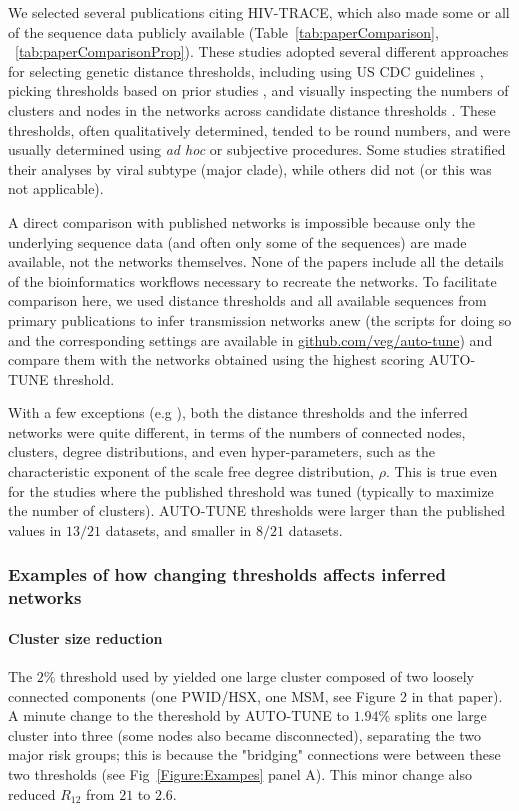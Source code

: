 \documentclass[utf8]{FrontiersinHarvard} %
\begin{document}
We selected several publications citing HIV-TRACE, which also made  some or all
of the sequence data publicly available (Table~\ref{tab:paperComparison},
~\ref{tab:paperComparisonProp}). These studies adopted several different
approaches for selecting genetic distance thresholds, including using US CDC
guidelines \citep{yan_central_2020}, picking thresholds based on prior studies
\citep{sivay_hiv-1_2018}, and visually inspecting the numbers of clusters and
nodes in the networks across candidate distance thresholds
\citep{liu_dynamics_2020}. These thresholds, often qualitatively determined,
tended to be round numbers, and were usually determined using {\it ad hoc} or
subjective procedures. Some studies stratified their analyses by viral subtype
(major clade), while others did not (or this was not applicable).

A direct comparison with published networks is impossible because only the
underlying sequence data (and often only some of the sequences) are made
available, not the networks themselves. None of the papers include all the
details of the bioinformatics workflows necessary to recreate the networks. To
facilitate comparison here, we used distance thresholds and all available
sequences from primary publications to infer transmission networks anew (the
scripts for doing so and the corresponding settings are available in
\url{github.com/veg/auto-tune}) and compare them with the networks obtained
using the highest scoring AUTO-TUNE threshold.

With a few exceptions (e.g \cite{dalai_combining_2018,sivay_hiv-1_2018}), both
the distance thresholds and the inferred networks were quite different, in
terms of the numbers of connected nodes, clusters, degree distributions, and
even hyper-parameters, such as the characteristic exponent of the scale free
degree distribution, $\rho$. This is true even for the studies where the
published threshold was tuned (typically to maximize the number of clusters).
AUTO-TUNE thresholds were larger than the published values in $13/21$ datasets,
and smaller in $8/21$ datasets. 

\subsubsection{Examples of how changing thresholds affects inferred networks}

\paragraph{Cluster size reduction} The $2\%$ threshold used by
\citet{dalai_combining_2018} yielded one large cluster composed of two loosely
connected components (one PWID/HSX, one MSM, see Figure 2 in that paper). A
minute change to the thereshold by AUTO-TUNE to $1.94\%$ splits one large
cluster into three (some nodes also became disconnected), separating the two
major risk groups; this is because the "bridging" connections were between
these two thresholds (see Fig~\ref{Figure:Exampes} panel A). This minor change
also reduced $R_{12}$ from $21$ to $2.6$.
\end{document}
